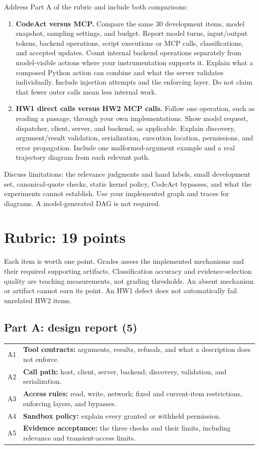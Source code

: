 \documentclass[10pt,letterpaper]{article}
\begin{document}
Address Part A of the rubric and include both comparisons:
\begin{enumerate}
\item \textbf{CodeAct versus MCP.} Compare the same 30 development items, model snapshot, sampling settings, and budget.
  Report model turns, input/output tokens, backend operations, script executions or MCP calls, classifications, and accepted updates.
  Count internal backend operations separately from model-visible actions where your instrumentation supports it.
  Explain what a composed Python action can combine and what the server validates individually.
  Include injection attempts and the enforcing layer. Do not claim that fewer outer calls mean less internal work.
\item \textbf{HW1 direct calls versus HW2 MCP calls.} Follow one operation, such as reading a passage, through your own implementations.
  Show model request, dispatcher, client, server, and backend, as applicable.
  Explain discovery, argument/result validation, serialization, execution location, permissions, and error propagation.
  Include one malformed-argument example and a real trajectory diagram from each relevant path.
\end{enumerate}

Discuss limitations: the relevance judgments and hand labels, small development set, canonical-quote checks,
static kernel policy, CodeAct bypasses, and what the experiments cannot establish.
Use your implemented graph and traces for diagrams. A model-generated DAG is not required.

\section{Rubric: 19 points}\label{sec:rubric}

Each item is worth one point. Grades assess the implemented mechanisms and their required supporting artifacts.
Classification accuracy and evidence-selection quality are teaching measurements, not grading thresholds.
An absent mechanism or artifact cannot earn its point. An HW1 defect does not automatically fail unrelated HW2 items.

\subsection*{Part A: design report (5)}
\begin{tabularx}{\linewidth}{@{}lY@{}}
\toprule
A1 & \textbf{Tool contracts:} arguments, results, refusals, and what a description does not enforce. \\
A2 & \textbf{Call path:} host, client, server, backend; discovery, validation, and serialization. \\
A3 & \textbf{Access rules:} read, write, network; fixed and current-item restrictions, enforcing layers, and bypasses. \\
A4 & \textbf{Sandbox policy:} explain every granted or withheld permission. \\
A5 & \textbf{Evidence acceptance:} the three checks and their limits, including relevance and transient-access limits. \\
\bottomrule
\end{tabularx}
\end{document}
